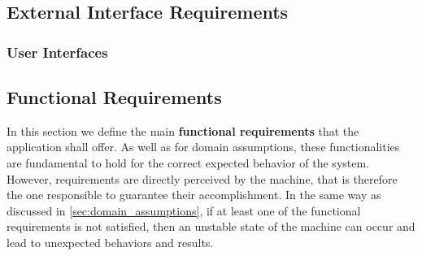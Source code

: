 \subsection{External Interface Requirements}
\label{sec:ex_interface_req}
\subsubsection{User Interfaces}



\subsection{Functional Requirements}
\label{sec:fun_req}
In this section we define the main \textbf{functional requirements} that the application shall offer. As well as for domain assumptions, these functionalities are fundamental to hold for the correct expected behavior of the system. However, requirements are directly perceived by the machine, that is therefore the one responsible to guarantee their accomplishment. In the same way as discussed in \ref{sec:domain_assumptions}, if at least one of the functional requirements is not satisfied, then an unstable state of the machine can occur and lead to unexpected behaviors and results.


